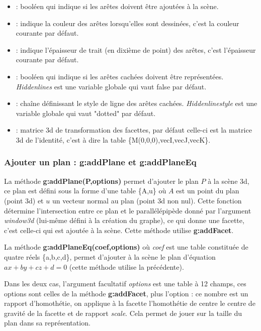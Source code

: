 \begin{itemize}
        \item {} : booléen qui indique si les arêtes doivent être ajoutées à la scène.
        \item {} : indique la couleur des arêtes lorsqu'elles sont dessinées, c'est la couleur courante par défaut.
        \item {}: indique l'épaisseur de trait (en dixième de point) des arêtes, c'est l'épaisseur courante par défaut.
        \item {} : booléen qui indique si les arêtes cachées doivent être représentées. \emph{Hiddenlines} est une variable globale qui vaut false par défaut.
        \item {} : chaîne définissant le style de ligne des arêtes cachées. \emph{Hiddenlinestyle} est une variable globale qui vaut "dotted" par défaut.
        \item {} : matrice 3d de transformation des facettes, par défaut celle-ci est la matrice 3d de l'identité, c'est à dire la table \{M(0,0,0),vecI,vecJ,vecK\}.
    \end{itemize}

\subsubsection{Ajouter un plan : g:addPlane et g:addPlaneEq}

La méthode \textbf{g:addPlane(P,options)} permet d'ajouter le plan $P$ à la scène 3d, ce plan est défini sous la forme d'une table \{A,u\} où $A$ est un point du plan (point 3d) et $u$ un vecteur normal au plan (point 3d non nul). Cette fonction détermine l'intersection entre ce plan et le parallélépipède donné par l'argument \emph{window3d} (lui-même défini à la création du graphe), ce qui donne une facette, c'est celle-ci qui est ajoutée à la scène. Cette méthode utilise \textbf{g:addFacet}.

La méthode \textbf{g:addPlaneEq(coef,options)} où \emph{coef} est une table constituée de quatre réels \{a,b,c,d\}, permet d'ajouter à la scène le plan d'équation $ax+by+cz+d=0$ (cette méthode utilise la précédente).

Dans les deux cas, l'argument facultatif \emph{options} est une table à 12 champs, ces options sont celles de la méthode \textbf{g:addFacet}, plus l'option  : ce nombre est un rapport d'homothétie, on applique à la facette l'homothétie de centre le centre de gravité de la facette et de rapport \emph{scale}. Cela permet de jouer sur la taille du plan dans sa représentation.
        

